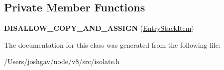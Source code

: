 \subsection*{Private Member Functions}
\begin{DoxyCompactItemize}
\item 
{\bfseries D\+I\+S\+A\+L\+L\+O\+W\+\_\+\+C\+O\+P\+Y\+\_\+\+A\+N\+D\+\_\+\+A\+S\+S\+I\+GN} (\hyperlink{classv8_1_1internal_1_1_isolate_1_1_entry_stack_item}{Entry\+Stack\+Item})\hypertarget{classv8_1_1internal_1_1_isolate_1_1_entry_stack_item_a06f863f66c1f919f526a9c1750164bfd}{}\label{classv8_1_1internal_1_1_isolate_1_1_entry_stack_item_a06f863f66c1f919f526a9c1750164bfd}

\end{DoxyCompactItemize}


The documentation for this class was generated from the following file\+:\begin{DoxyCompactItemize}
\item 
/\+Users/joshgav/node/v8/src/isolate.\+h\end{DoxyCompactItemize}
